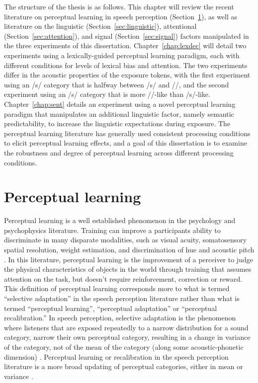 The structure of the thesis is as follows.
This chapter will review the recent literature on perceptual learning in speech perception (Section~\ref{sec:perceptuallearning}), as well as literature on the linguistic (Section~\ref{sec:linguistic}), attentional (Section~\ref{sec:attention}), and signal (Section~\ref{sec:signal}) factors manipulated in the three experiments of this dissertation.
Chapter~\ref{chap:lexdec} will detail two experiments using a lexically-guided perceptual learning paradigm, each with different conditions for levels of lexical bias and attention.  
The two experiments differ in the acoustic properties of the exposure tokens, with the first experiment using an /s/ category that is halfway between /s/ and /\textesh/, and the second experiment using an /s/ category that is more /\textesh/-like than /s/-like.  
Chapter~\ref{chap:sent} details an experiment using a novel perceptual learning paradigm that manipulates an additional linguistic factor, namely semantic predictability, to increase the linguistic expectations during exposure.
The perceptual learning literature has generally used consistent processing conditions to elicit perceptual learning effects, and a goal of this dissertation is to examine the robustness and degree of perceptual learning across different processing conditions.

\section{Perceptual learning}
\label{sec:perceptuallearning}

Perceptual learning is a well established phenomenon in the psychology and psychophysics literature. 
Training can improve a participants ability to discriminate in many disparate modalities, such as visual acuity, somatosensory spatial resolution, weight estimation, and discrimination of hue and acoustic pitch \citep[for review]{Gibson1953}. 
In this literature, perceptual learning is the improvement of a perceiver to judge the physical characteristics of objects in the world through training that assumes attention on the task, but doesn't require reinforcement, correction or reward.
This definition of perceptual learning corresponds more to what is termed ``selective adaptation'' in the speech perception literature rather than what is termed ``perceptual learning'', ``perceptual adaptation'' or ``perceptual recalibration.''  
In speech perception, selective adaptation is the phenomenon where listeners that are exposed repeatedly to a narrow distribution for a sound category, narrow their own perceptual category, resulting in a change in variance of the category, not of the mean of the category (along some acoustic-phonetic dimension) \citep{Eimas1973,Samuel1986,Vroomen2007}.
Perceptual learning or recalibration in the speech perception literature is a more broad updating of perceptual categories, either in mean or variance \citep{Norris2003, Vroomen2007}.

